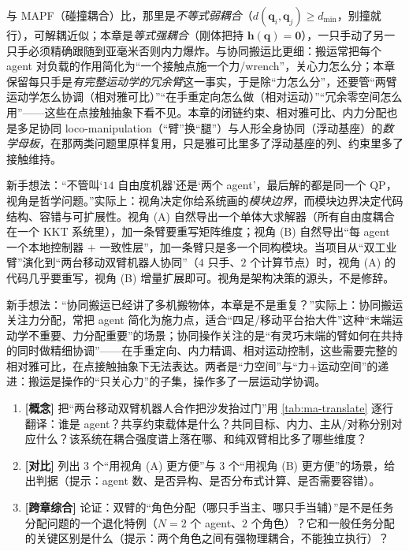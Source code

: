 \noindent 与 MAPF（碰撞耦合）比，那里是\emph{不等式弱耦合}（$d(\mathbf{q}_i,\mathbf{q}_j)\ge d_{\min}$，别撞就行），可解耦近似；本章是\emph{等式强耦合}（刚体把持 $\mathbf{h}(\mathbf{q})=\mathbf{0}$），一只手动了另一只手必须精确跟随到亚毫米否则内力爆炸。与协同搬运比更细：搬运常把每个 agent 对负载的作用简化为“一个接触点施一个力/wrench”，关心力怎么分；本章保留每只手是\emph{有完整运动学的冗余臂}这一事实，于是除“力怎么分”，还要管“两臂运动学怎么协调（相对雅可比）”“在手重定向怎么做（相对运动）”“冗余零空间怎么用”——这些在点接触抽象下看不见。本章的闭链约束、相对雅可比、内力分配也是多足协同 loco-manipulation（“臂”换“腿”）与人形全身协同（浮动基座）的\emph{数学母板}，在那两类问题里原样复用，只是雅可比里多了浮动基座的列、约束里多了接触维持。

\begin{pitfall}
新手想法：“不管叫‘$14$ 自由度机器’还是‘两个 agent’，最后解的都是同一个 QP，视角是哲学问题。”实际上：视角决定你给系统画的\emph{模块边界}，而模块边界决定代码结构、容错与可扩展性。视角 (A) 自然导出一个单体大求解器（所有自由度耦合在一个 KKT 系统里），加一条臂要重写矩阵维度；视角 (B) 自然导出“每 agent 一个本地控制器 $+$ 一致性层”，加一条臂只是多一个同构模块。当项目从“双工业臂”演化到“两台移动双臂机器人协同”（$4$ 只手、$2$ 个计算节点）时，视角 (A) 的代码几乎要重写，视角 (B) 增量扩展即可。视角是架构决策的源头，不是修辞。
\end{pitfall}

\begin{pitfall}[概念误区：认为“协同操作 $=$ 协同搬运”]
新手想法：“协同搬运已经讲了多机搬物体，本章是不是重复？”实际上：协同搬运关注力分配，常把 agent 简化为施力点，适合“四足/移动平台抬大件”这种“末端运动学不重要、力分配重要”的场景；协同操作关注的是“有灵巧末端的臂如何在共持的同时做精细协调”——在手重定向、内力精调、相对运动控制，这些需要完整的相对雅可比，在点接触抽象下无法表达。两者是“力空间”与“力$+$运动空间”的递进：搬运是操作的“只关心力”的子集，操作多了一层运动学协调。
\end{pitfall}

\begin{exercise}
\begin{enumerate}
  \item \textbf{[概念]} 把“两台移动双臂机器人合作把沙发抬过门”用 \cref{tab:ma-translate} 逐行翻译：谁是 agent？共享约束载体是什么？共同目标、内力、主从/对称分别对应什么？该系统在耦合强度谱上落在哪、和纯双臂相比多了哪些维度？
  \item \textbf{[对比]} 列出 $3$ 个“用视角 (A) 更方便”与 $3$ 个“用视角 (B) 更方便”的场景，给出判据（提示：agent 数、是否异构、是否分布式计算、是否需要容错）。
  \item \textbf{[跨章综合]} 论证：双臂的“角色分配（哪只手当主、哪只手当辅）”是不是任务分配问题的一个退化特例（$N=2$ 个 agent、$2$ 个角色）？它和一般任务分配的关键区别是什么（提示：两个角色之间有强物理耦合，不能独立执行）？
\end{enumerate}
\end{exercise}

